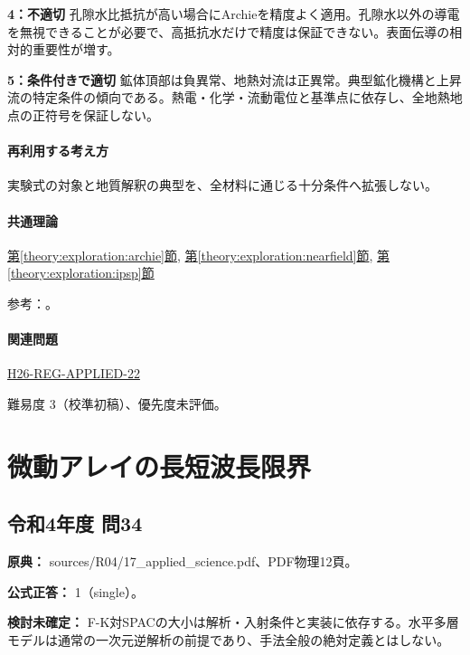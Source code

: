 \noindent\textbf{4：不適切} 孔隙水比抵抗が高い場合にArchieを精度よく適用。孔隙水以外の導電を無視できることが必要で、高抵抗水だけで精度は保証できない。表面伝導の相対的重要性が増す。\par

\noindent\textbf{5：条件付きで適切} 鉱体頂部は負異常、地熱対流は正異常。典型鉱化機構と上昇流の特定条件の傾向である。熱電・化学・流動電位と基準点に依存し、全地熱地点の正符号を保証しない。\par

\paragraph{再利用する考え方} 実験式の対象と地質解釈の典型を、全材料に通じる十分条件へ拡張しない。

\paragraph{共通理論} \hyperref[theory:exploration:archie]{第\ref*{theory:exploration:archie}節}, \hyperref[theory:exploration:nearfield]{第\ref*{theory:exploration:nearfield}節}, \hyperref[theory:exploration:ipsp]{第\ref*{theory:exploration:ipsp}節}

\par 参考：\cite{epa_borehole_resistivity,epa_resistivity,epa_sp,usgs_csamt2012}。

\paragraph{関連問題} \hyperref[q:h26-reg-applied-22]{H26-REG-APPLIED-22}

\par 難易度 3（校準初稿）、優先度未評価。

\section{微動アレイの長短波長限界}

\subsection{令和4年度 問34}
\label{q:r04-reg-applied-34}

\noindent\textbf{原典：} sources/R04/17\_applied\_science.pdf、PDF物理12頁。

\textbf{公式正答：} 1（single）。

\par\textbf{検討未確定：} F-K対SPACの大小は解析・入射条件と実装に依存する。水平多層モデルは通常の一次元逆解析の前提であり、手法全般の絶対定義とはしない。

